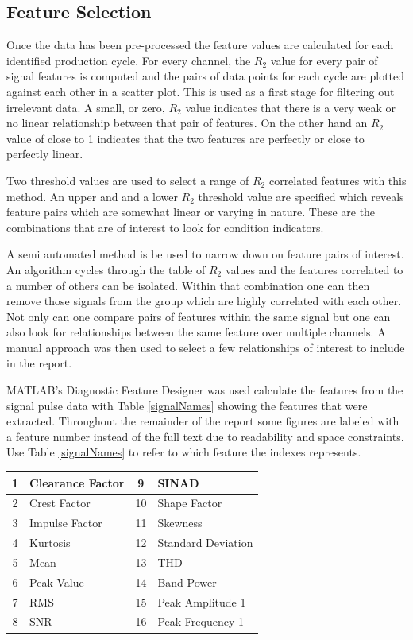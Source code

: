 \documentclass[]{article}
\begin{document}
\subsection{Feature Selection}
Once the data has been pre-processed the feature values are calculated for each identified production cycle. For every channel, the $R_2$ value for every pair of signal features is computed and the pairs of data points for each cycle are plotted against each other in a scatter plot. This is used as a first stage for filtering out irrelevant data. A small, or zero, $R_2$ value indicates that there is a very weak or no linear relationship between that pair of features. On the other hand an $R_2$ value of close to 1 indicates that the two features are perfectly or close to perfectly linear.

Two threshold values are used to select a range of $R_2$ correlated features with this method. An upper and and a lower $R_2$ threshold value are specified which reveals feature pairs which are somewhat linear or varying in nature. These are the combinations that are of interest to look for condition indicators.

A semi automated method is be used to narrow down on feature pairs of interest. An algorithm cycles through the table of $R_2$ values and the features correlated to a number of others can be isolated. Within that combination one can then remove those signals from the group which are highly correlated with each other. Not only can one compare pairs of features within the same signal but one can also look for relationships between the same feature over multiple channels. A manual approach was then used to select a few relationships of interest to include in the report.

MATLAB's Diagnostic Feature Designer was used calculate the features from the signal pulse data with Table \ref{signalNames} showing the features that were extracted. Throughout the remainder of the report some figures are labeled with a feature number instead of the full text due to readability and space constraints. Use Table \ref{signalNames} to refer to which feature the indexes represents.

\begin{center}
\label{featureNames}
\begin{tabular}{ |c|l|c|l| }
 \hline
 1 & Clearance Factor & 9 & \gls{SINAD}\\
 \hline
 2 & Crest Factor & 10 & Shape Factor\\
 \hline
 3 & Impulse Factor & 11 & Skewness\\
 \hline
 4 & Kurtosis & 12 & Standard Deviation\\
 \hline
 5 & Mean & 13 & \gls{THD}\\
 \hline
 6 & Peak Value &  14 & Band Power \\
 \hline
 7 & \gls{RMS} & 15 & Peak Amplitude 1\\ 
 \hline              
 8 & \gls{SNR} & 16 & Peak Frequency 1 \\
 \hline        
\end{tabular}
\end{center}
\end{document}
